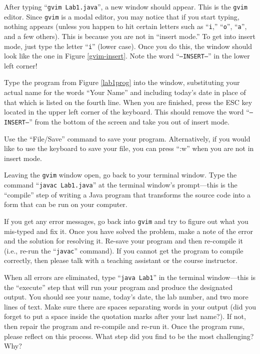 \documentclass[11pt]{article}
\begin{document}
After typing ``{\tt gvim Lab1.java}'', a new window should appear. This is the {\tt gvim} editor.  Since {\tt gvim} is a
modal editor, you may notice that if you start typing, nothing appears (unless you happen to hit certain letters such as
  ``{\tt i},'' ``{\tt o}'', ``{\tt a}'', and a few others). This is because you are not in ``insert mode.'' To get into
insert mode, just type the letter ``{\tt i}'' (lower case). Once you do this, the window should look like the one in
Figure \ref{gvim-insert}. Note the word ``{\tt --INSERT--}'' in the lower left corner!

Type the program from Figure \ref{lab1prog} into the window, substituting your actual name for the words ``Your Name''
and including today's date in place of that which is listed on the fourth line. When you are finished, press the ESC
key located in the upper left corner of the keyboard. This should remove the word ``{\tt --INSERT--}'' from the bottom
of the screen and take you out of insert mode.

Use the ``File/Save'' command to save your program. Alternatively, if you would like to use the keyboard to save your
file, you can press ``:w'' when you are not in insert mode.

Leaving the {\tt gvim} window open, go back to your terminal window. Type the command ``{\tt javac Lab1.java}'' at the
terminal window's prompt---this is the ``compile'' step of writing a Java program that transforms the source code into a
form that can be run on your computer.

If you get any error messages, go back into {\tt gvim} and try to figure out what you mis-typed and fix it. Once you
have solved the problem, make a note of the error and the solution for resolving it. Re-save your program and then
re-compile it (i.e., re-run the ``{\tt javac}'' command). If you cannot get the program to compile correctly, then
please talk with a teaching assistant or the course instructor.

When all errors are eliminated, type ``{\tt java Lab1}'' in the terminal window---this is the ``execute'' step that will
run your program and produce the designated output.  You should see your name, today's date, the lab number, and two
more lines of text. Make sure there are spaces separating words in your output (did you forget to put a space inside the
quotation marks after your last name?). If not, then repair the program and re-compile and re-run it.  Once the program
runs, please reflect on this process.  What step did you find to be the most challenging? Why?
\end{document}
